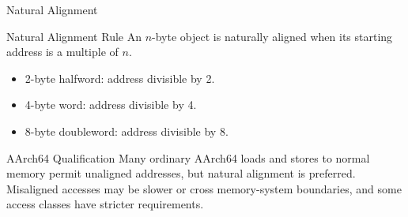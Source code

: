\documentclass[aspectratio=169,11pt,t]{beamer}
\begin{document}
\begin{frame}{Natural Alignment}
\begin{block}{Natural Alignment Rule}
An $n$-byte object is naturally aligned when its starting address is a multiple of $n$.
\end{block}
\vspace{0.2cm}
\begin{itemize}
\item 2-byte halfword: address divisible by 2.
\item 4-byte word: address divisible by 4.
\item 8-byte doubleword: address divisible by 8.
\end{itemize}
\vspace{0.15cm}
\begin{block}{AArch64 Qualification}
Many ordinary AArch64 loads and stores to normal memory permit unaligned addresses, but natural alignment is preferred. Misaligned accesses may be slower or cross memory-system boundaries, and some access classes have stricter requirements.
\end{block}
\end{frame}
\end{document}
